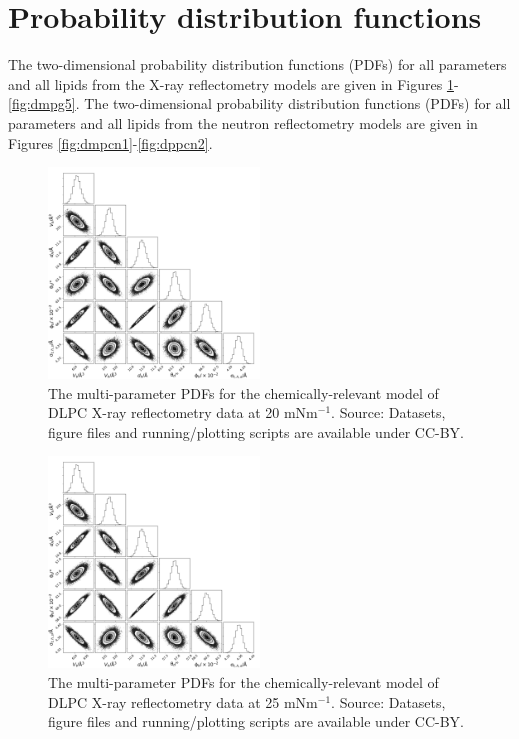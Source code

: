\documentclass[11pt,a4paper]{article}
\begin{document}
\section{Probability distribution functions}

The two-dimensional probability distribution functions (PDFs) for all parameters and all lipids from the X-ray reflectometry models are given in Figures \ref{fig:dlpc2}-\ref{fig:dmpg5}. The two-dimensional probability distribution functions (PDFs) for all parameters and all lipids from the neutron reflectometry models are given in Figures \ref{fig:dmpcn1}-\ref{fig:dppcn2}.
\begin{figure}[h]
	\centering
	\includegraphics[width=0.50\textwidth]{figures/dlpc1_all_corner}
	\caption{The multi-parameter PDFs for the chemically-relevant model of DLPC X-ray reflectometry data at 20 mNm$^{-1}$. Source: Datasets, figure files and running/plotting scripts are available under CC-BY.\cite{mccluskey_2018}}
	\label{fig:dlpc2}
\end{figure}
\begin{figure}[h]
	\centering
	\includegraphics[width=0.50\textwidth]{figures/dlpc2_all_corner}
	\caption{The multi-parameter PDFs for the chemically-relevant model of DLPC X-ray reflectometry data at 25 mNm$^{-1}$. Source: Datasets, figure files and running/plotting scripts are available under CC-BY.\cite{mccluskey_2018}}
	\label{fig:dlpc3}
\end{figure}
\end{document}
